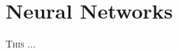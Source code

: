 \chapter{Neural Networks}
\label{chap:neuralnetworks}
%
\lettrine[lines=3]{T}{his} ...
% 
% 
% 
% 
% 
